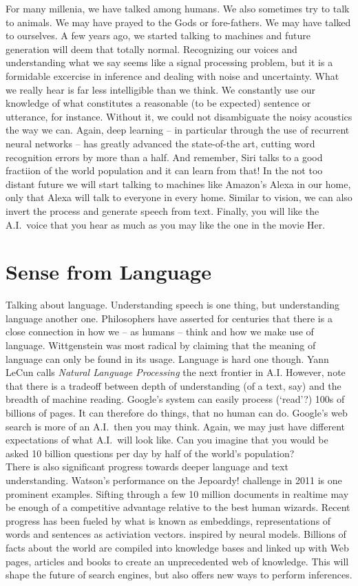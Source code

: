 \documentclass[a4]{article}
\begin{document}
\noindent For many millenia, we have talked among humans. We also sometimes try to talk to animals. We may have prayed to the Gods or fore-fathers. We may have talked to ourselves. A few years ago, we started talking to machines and future generation will deem that totally normal. Recognizing our voices and understanding what we say seems like a signal processing problem, but it is a formidable excercise in inference and dealing with noise and uncertainty. What we really hear is far less intelligible than we think. We constantly use our knowledge of what constitutes a reasonable (to be expected) sentence or utterance, for instance. Without it, we could not disambiguate the noisy acoustics the way we can. Again, deep learning -- in particular through the use of recurrent neural networks -- has greatly advanced the state-of-the art, cutting word recognition errors by more than a half. And remember, Siri talks to a good fractiion of the world population and it can learn from that! In the not too distant future we will start talking to machines like Amazon's Alexa in our home, only that Alexa will talk to everyone in every home. Similar to vision, we can also invert the process and generate speech from text. Finally, you will like the A.I.~voice that you hear as much as you may like the one in the movie Her.\\


\section{Sense from Language}

Talking about language. Understanding speech is one thing, but understanding language another one. Philosophers have asserted for centuries that there is a close connection in how we -- as humans -- think and how we make use of language. Wittgenstein was most radical by claiming that the meaning of language can only be found in its usage.  Language is hard one though. Yann LeCun calls \textit{Natural Language Processing} the next frontier in A.I. However, note that there is a tradeoff between depth of understanding (of a text, say) and the breadth of machine reading. Google's system can easily process (`read'?) 100s of billions of pages. It can therefore do things, that no human can do. Google's web search is more of an A.I.~then you may think. Again, we may just have different expectations of what A.I.~will look like. Can you imagine that you would be asked 10 billion questions per day by half of the world's population? \\

\noindent There is also significant progress towards deeper language and text understanding. Watson's performance on the Jepoardy! challenge in 2011 is one prominent examples. Sifting through a few 10 million documents in realtime may be enough of a competitive advantage relative to the best human wizards. Recent progress has been fueled by what is known as embeddings, representations of words and  sentences as activiation vectors. inspired by neural models. Billions of facts about the world are compiled into knowledge bases and linked up with Web pages, articles and books to create an unprecedented web of knowledge. This will shape the future of search engines, but also offers new ways to perform inferences.
\end{document}
